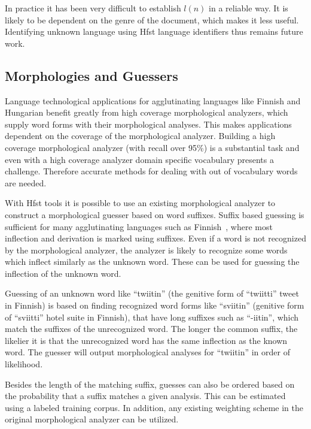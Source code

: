 \documentclass{llncs}
\begin{document}
In practice it has been very difficult to establish $l(n)$ in a
reliable way. It is likely to be dependent on the genre of the
document, which makes it less useful. Identifying unknown language
using Hfst language identifiers thus remains future work.

\subsection{Morphologies and Guessers}
\label{sec: morph-guessers}

Language technological applications for agglutinating languages like
Finnish and Hungarian benefit greatly from high coverage morphological
analyzers, which supply word forms with their morphological
analyses. This makes applications dependent on the coverage of the
morphological analyzer. Building a high coverage morphological
analyzer (with recall over 95\%) is a substantial task and even with a
high coverage analyzer domain specific vocabulary presents a
challenge. Therefore accurate methods for dealing with out of
vocabulary words are needed.

With Hfst tools it is possible to use an existing morphological
analyzer to construct a morphological guesser based on word
suffixes. Suffix based guessing is sufficient for many agglutinating
languages such as Finnish~\cite{linden/2009/nodalida}, where most
inflection and derivation is marked using suffixes. Even if a word is
not recognized by the morphological analyzer, the analyzer is likely
to recognize some words which inflect similarly as the unknown
word. These can be used for guessing the inflection of the unknown
word.

Guessing of an unknown word like ``twiitin'' (the genitive form of
``twiitti'' tweet in Finnish) is based on finding recognized word
forms like ``sviitin'' (genitive form of ``sviitti'' hotel suite in
Finnish), that have long suffixes such as ``-iitin'', which match the
suffixes of the unrecognized word. The longer the common suffix, the
likelier it is that the unrecognized word has the same inflection as
the known word. The guesser will output morphological analyses for
``twiitin'' in order of likelihood.

Besides the length of the matching suffix, guesses can also be ordered
based on the probability that a suffix matches a given analysis. This
can be estimated using a labeled training corpus. In addition, any
existing weighting scheme in the original morphological analyzer can
be utilized.
\end{document}
